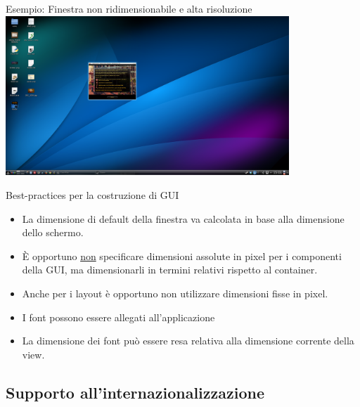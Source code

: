 \documentclass[presentation]{beamer}
\begin{document}
\begin{frame}{Esempio: Finestra non ridimensionabile e alta risoluzione}
\centering
\includegraphics[width=0.8\textwidth]{img/brokensword}
\end{frame}

\begin{frame}{Best-practices per la costruzione di GUI}
\begin{itemize}\itemsep10pt
\item La dimensione di default della finestra va calcolata in base alla dimensione dello schermo.
\item \`{E} opportuno \underline{non} specificare dimensioni assolute in pixel per i componenti della GUI, ma dimensionarli in termini relativi rispetto al container.
\item Anche per i layout è opportuno non utilizzare dimensioni fisse in pixel.
\item I font possono essere allegati all'applicazione
\item La dimensione dei font può essere resa relativa alla dimensione corrente della view.
\end{itemize}
\end{frame}

\subsection{Supporto all'internazionalizzazione}
\end{document}
